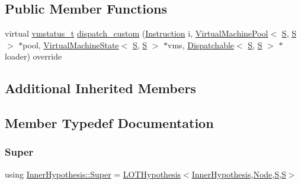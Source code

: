 \subsection*{Public Member Functions}
\begin{DoxyCompactItemize}
\item 
virtual \hyperlink{_instruction_8h_a6202215407ab29590bb936ca2996cf64}{vmstatus\+\_\+t} \hyperlink{class_inner_hypothesis_a73c38e91c7c1bf021cbc8f9e5a758d13}{dispatch\+\_\+custom} (\hyperlink{class_instruction}{Instruction} i, \hyperlink{class_virtual_machine_pool}{Virtual\+Machine\+Pool}$<$ \hyperlink{_formal_language_theory-_complex_2_main_8cpp_a51c40915539205f0b5add30b0d68a4cb}{S}, \hyperlink{_formal_language_theory-_complex_2_main_8cpp_a51c40915539205f0b5add30b0d68a4cb}{S} $>$ $\ast$pool, \hyperlink{class_virtual_machine_state}{Virtual\+Machine\+State}$<$ \hyperlink{_formal_language_theory-_complex_2_main_8cpp_a51c40915539205f0b5add30b0d68a4cb}{S}, \hyperlink{_formal_language_theory-_complex_2_main_8cpp_a51c40915539205f0b5add30b0d68a4cb}{S} $>$ $\ast$vms, \hyperlink{class_dispatchable}{Dispatchable}$<$ \hyperlink{_formal_language_theory-_complex_2_main_8cpp_a51c40915539205f0b5add30b0d68a4cb}{S}, \hyperlink{_formal_language_theory-_complex_2_main_8cpp_a51c40915539205f0b5add30b0d68a4cb}{S} $>$ $\ast$loader) override
\end{DoxyCompactItemize}
\subsection*{Additional Inherited Members}


\subsection{Member Typedef Documentation}
\mbox{\label{class_inner_hypothesis_a2c15665b923d905f1f7441282780abc2}} 
\subsubsection{\texorpdfstring{Super}{Super}}
{\footnotesize\ttfamily using \hyperlink{class_inner_hypothesis_a2c15665b923d905f1f7441282780abc2}{Inner\+Hypothesis\+::\+Super} =  \hyperlink{class_l_o_t_hypothesis}{L\+O\+T\+Hypothesis}$<$\hyperlink{class_inner_hypothesis}{Inner\+Hypothesis},\hyperlink{class_node}{Node},\hyperlink{_formal_language_theory-_complex_2_main_8cpp_a51c40915539205f0b5add30b0d68a4cb}{S},\hyperlink{_formal_language_theory-_complex_2_main_8cpp_a51c40915539205f0b5add30b0d68a4cb}{S}$>$}




